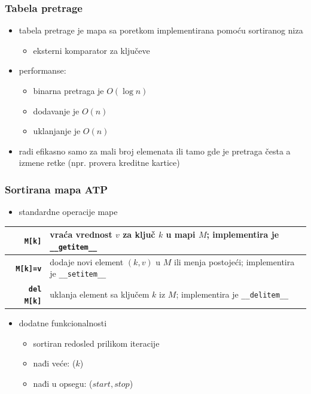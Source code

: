\documentclass[compress]{beamer}
\begin{document}
\begin{frame}[fragile]
  \frametitle{Tabela pretrage}
  \begin{itemize}
    \item tabela pretrage je mapa sa poretkom implementirana pomoću sortiranog niza 
    \begin{itemize}
      \item eksterni komparator za ključeve
    \end{itemize}
    \item performanse: 
    \begin{itemize}
      \item binarna pretraga je $O(\log n)$
      \item dodavanje je $O(n)$
      \item uklanjanje je $O(n)$
    \end{itemize}
    \item radi efikasno samo za mali broj elemenata ili tamo gde je pretraga česta a izmene retke (npr. provera kreditne kartice) 
  \end{itemize}
\end{frame}

\begin{frame}[fragile]
  \frametitle{Sortirana mapa ATP}
  \begin{itemize}
    \item standardne operacije mape 
  \end{itemize}
  \begin{center}
    \begin{tabular}{rp{8cm}}
      \textbf{\texttt{M[k]}} & vraća vrednost $v$ za ključ $k$ u mapi $M$; implementira je \texttt{\_\_getitem\_\_} \\ \hline
      \textbf{\texttt{M[k]=v}} & dodaje novi element $(k, v)$ u $M$ ili menja postojeći; implementira je \texttt{\_\_setitem\_\_} \\ \hline
      \textbf{\texttt{del M[k]}} & uklanja element sa ključem $k$ iz $M$; implementira je \texttt{\_\_delitem\_\_} \\
    \end{tabular}
  \end{center}
  \begin{itemize}
    \item dodatne funkcionalnosti 
    \begin{itemize}
      \item sortiran redosled prilikom iteracije
      \item nađi veće: ($k$)
      \item nađi u opsegu: ($start, stop$) 
    \end{itemize}
  \end{itemize}
\end{frame}
\end{document}
